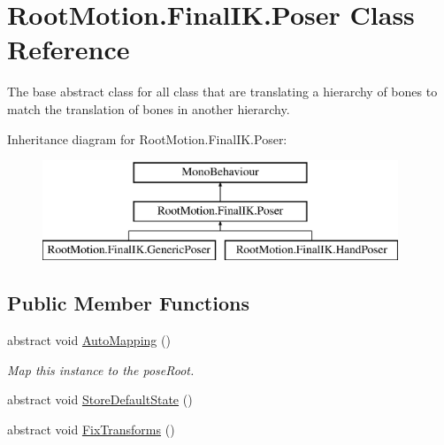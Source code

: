 \hypertarget{class_root_motion_1_1_final_i_k_1_1_poser}{}\section{Root\+Motion.\+Final\+I\+K.\+Poser Class Reference}
\label{class_root_motion_1_1_final_i_k_1_1_poser}


The base abstract class for all class that are translating a hierarchy of bones to match the translation of bones in another hierarchy.  


Inheritance diagram for Root\+Motion.\+Final\+I\+K.\+Poser\+:\begin{figure}[H]
\begin{center}
\leavevmode
\includegraphics[height=3.000000cm]{class_root_motion_1_1_final_i_k_1_1_poser}
\end{center}
\end{figure}
\subsection*{Public Member Functions}
\begin{DoxyCompactItemize}
\item 
abstract void \mbox{\hyperlink{class_root_motion_1_1_final_i_k_1_1_poser_af8bf01f5bada3be99c43121b61022238}{Auto\+Mapping}} ()
\begin{DoxyCompactList}\small\item\em Map this instance to the pose\+Root. \end{DoxyCompactList}\item 
abstract void \mbox{\hyperlink{class_root_motion_1_1_final_i_k_1_1_poser_ab5636eab097e6dbd2c7f3819c8508918}{Store\+Default\+State}} ()
\item 
abstract void \mbox{\hyperlink{class_root_motion_1_1_final_i_k_1_1_poser_ad80c2188b9a1855ff78f3dadba42362d}{Fix\+Transforms}} ()
\end{DoxyCompactItemize}
